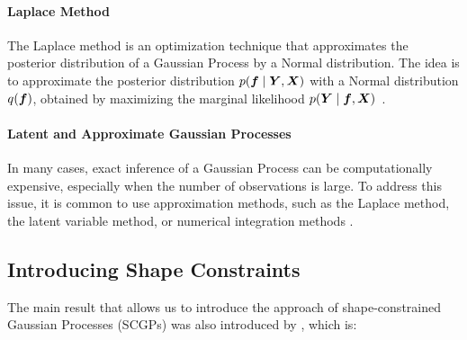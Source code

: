 \paragraph{Laplace Method}

The Laplace method is an optimization technique that approximates the posterior distribution of a Gaussian Process by a Normal distribution.
The idea is to approximate the posterior distribution \( p(\boldsymbol{f} \mid \boldsymbol{Y}, \boldsymbol{X}) \) with a Normal distribution \( q(\boldsymbol{f}) \), obtained by maximizing the marginal likelihood \( p(\boldsymbol{Y} \mid \boldsymbol{f}, \boldsymbol{X}) \)~\cite{Riihimaki2013}.

\paragraph{Latent and Approximate Gaussian Processes}

In many cases, exact inference of a Gaussian Process can be computationally expensive, especially when the number of observations is large.
To address this issue, it is common to use approximation methods, such as the Laplace method, the latent variable method, or numerical integration methods \cite{Williams1998}. 


\subsection{Introducing Shape Constraints}
\label{sec:scgp}

The main result that allows us to introduce the approach of shape-constrained Gaussian Processes (SCGPs) was also introduced by \cite{Rasmussen2005}, which is:

